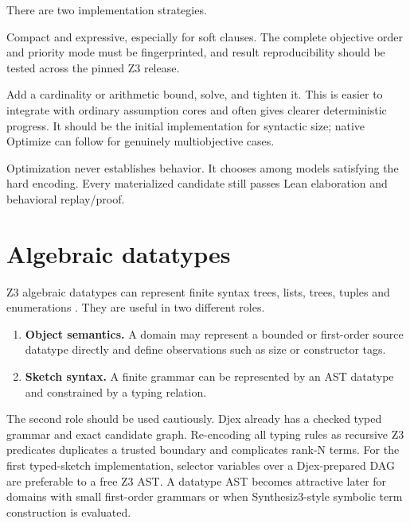 \documentclass[11pt,oneside]{report}
\begin{document}
There are two implementation strategies.

\begin{description}[leftmargin=2.2em,style=nextline]
\item[Native Optimize.] Compact and expressive, especially for soft clauses. The complete objective order and priority mode must be fingerprinted, and result reproducibility should be tested across the pinned Z3 release.
\item[Iterative SAT.] Add a cardinality or arithmetic bound, solve, and tighten it. This is easier to integrate with ordinary assumption cores and often gives clearer deterministic progress. It should be the initial implementation for syntactic size; native Optimize can follow for genuinely multiobjective cases.
\end{description}

Optimization never establishes behavior. It chooses among models satisfying the hard encoding. Every materialized candidate still passes Lean elaboration and behavioral replay/proof.

\section{Algebraic datatypes}

Z3 algebraic datatypes can represent finite syntax trees, lists, trees, tuples and enumerations \cite{z3-datatypes}. They are useful in two different roles.

\begin{enumerate}[leftmargin=2em]
\item \textbf{Object semantics.} A domain may represent a bounded or first-order source datatype directly and define observations such as size or constructor tags.
\item \textbf{Sketch syntax.} A finite grammar can be represented by an AST datatype and constrained by a typing relation.
\end{enumerate}

The second role should be used cautiously. Djex already has a checked typed grammar and exact candidate graph. Re-encoding all typing rules as recursive Z3 predicates duplicates a trusted boundary and complicates rank-N terms. For the first typed-sketch implementation, selector variables over a Djex-prepared DAG are preferable to a free Z3 AST. A datatype AST becomes attractive later for domains with small first-order grammars or when Synthesiz3-style symbolic term construction is evaluated.
\end{document}
